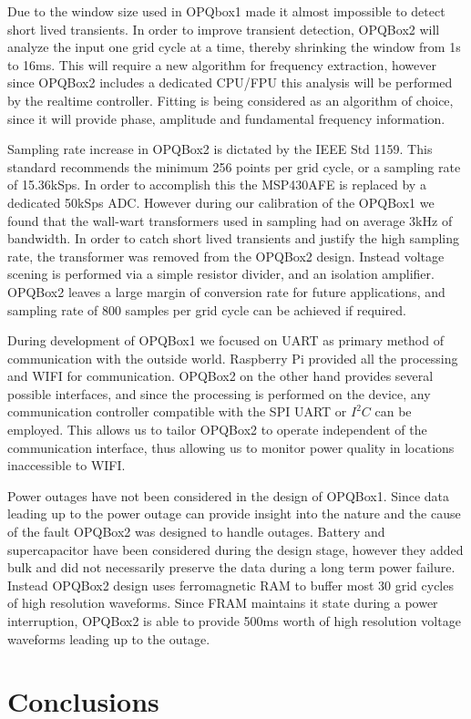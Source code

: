 Due to the window size used in OPQbox1 made it almost impossible to detect short lived transients. In order to improve transient detection, OPQBox2 will analyze the input one grid cycle 
at a time, thereby shrinking the window from 1s to 16ms. This will require a new algorithm for frequency extraction, however since OPQBox2 includes a dedicated CPU/FPU this analysis will be performed by the realtime controller. Fitting is being considered as an algorithm of choice, since it will provide phase, amplitude and fundamental frequency information.

Sampling rate increase in OPQBox2 is dictated by the IEEE Std 1159. This standard recommends the minimum 256 points per grid cycle, or a sampling rate of 15.36kSps. In order to accomplish this
the MSP430AFE is replaced by a dedicated 50kSps ADC. However during our calibration of the OPQBox1 we found that the wall-wart transformers used in sampling had on average 3kHz of bandwidth.
In order to catch short lived transients and justify the high sampling rate, the transformer was removed from the OPQBox2 design. Instead voltage scening is performed via a simple resistor
divider, and an isolation amplifier. OPQBox2 leaves a large margin of conversion rate for future applications, and sampling rate of 800 samples per grid cycle can be achieved if required.

During development of OPQBox1 we focused on UART as primary method of communication with the outside world. Raspberry Pi provided all the processing and WIFI for communication. OPQBox2 on the other hand provides several possible interfaces, and since the processing is performed on the device, any communication controller compatible with the SPI UART or $I^2C$
can be employed. This allows us to tailor OPQBox2 to operate independent of the communication interface, thus allowing us to monitor power quality in locations inaccessible to WIFI.

Power outages have not been considered in the design of OPQBox1. Since data leading up to the power outage can provide insight into the nature and the cause of the fault OPQBox2 was
designed to handle outages. Battery and supercapacitor have been considered during the design stage, however they added bulk and did not necessarily preserve the data during a long term power failure. Instead OPQBox2 design uses ferromagnetic RAM to buffer most 30 grid cycles of high resolution waveforms. Since FRAM maintains it state during a power interruption, 
OPQBox2 is able to provide 500ms worth of high resolution voltage waveforms leading up to the outage.

\section{Conclusions}
